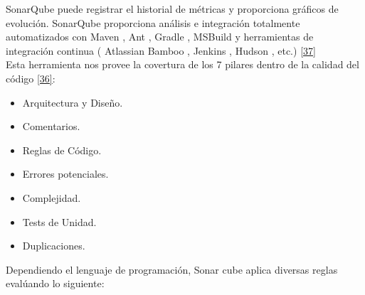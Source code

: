 SonarQube puede registrar el historial de métricas y proporciona gráficos de evolución. SonarQube proporciona análisis e integración totalmente automatizados con Maven , Ant , Gradle , MSBuild y herramientas de integración continua ( Atlassian Bamboo , Jenkins , Hudson , etc.) \hyperlink{b37}{[37]}\\

Esta herramienta nos provee la covertura de los 7 pilares dentro de la calidad del código \hyperlink{b36}{[36]}: 

\begin{itemize}
	\item Arquitectura y Diseño.
	\item Comentarios.
	\item Reglas de Código.
	\item Errores potenciales.
	\item Complejidad.
	\item Tests de Unidad.
	\item Duplicaciones.
\end{itemize}

Dependiendo el lenguaje de programación, Sonar cube aplica  diversas reglas evalúando lo siguiente:

